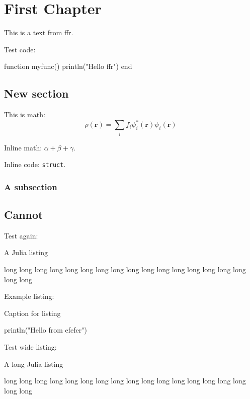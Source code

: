 \documentclass[
    fontsize=10pt,
    twoside=true,
    secnumdepth=1,
    numbers=noenddot,
]{kaobook}
\newcommand{\jlinline}[1]{\texttt{#1}}
\begin{document}
\chapter{First Chapter}

\blindtext

This is a text from ffr.

Test code:
\begin{juliacode}
function myfunc()
    println("Hello ffr")
end
\end{juliacode}

\section{New section}
This is math:
\begin{equation}
\rho(\mathbf{r}) = \sum_{i} f_{i} \psi_{i}^{*}(\mathbf{r}) \psi_{i}(\mathbf{r})
\end{equation}

Inline math: $\alpha + \beta + \gamma$.

Inline code: \jlinline{struct}.

\subsection{A subsection}

\blindtext

\section{Cannot}

Test again:
\begin{listing}
\caption{A Julia listing}
\begin{juliacode}
long long long long long long long long long long long long long long long long long long
\end{juliacode}
\end{listing}

Example listing:
\begin{marginlisting}[-0.5cm]
\caption{Caption for listing}
\vspace{0.5cm}
\begin{juliacode}
println("Hello from efefer")
\end{juliacode}
\end{marginlisting}

Test wide listing:
\begin{listing*}[h!]
\caption{A long Julia listing}
\begin{juliacode}
long long long long long long long long long long long long
long long long long long long
\end{juliacode}
\end{listing*}
\end{document}
